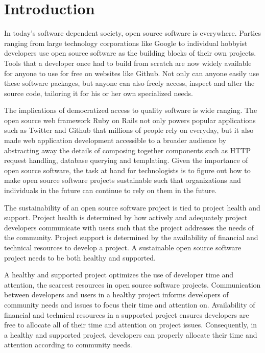 \section{Introduction}

In today's software dependent society, open source software is everywhere.
Parties ranging from large technology corporations like Google to individual
hobbyist developers use open source software as the building blocks of their own
projects. Tools that a developer once had to build from scratch are now widely
available for anyone to use for free on websites like Github. Not only can
anyone easily use these software packages, but anyone can also freely access,
inspect and alter the source code, tailoring it for his or her own specialized needs.

The implications of democratized access to quality software is wide ranging. The
open source web framework Ruby on Rails not only powers popular applications
such as Twitter and Github that millions of people rely on everyday, but it also
made web application development accessible to a broader audience by abstracting
away the details of composing together components such as HTTP request handling,
database querying and templating. Given the importance of open source software,
the task at hand for technologists is to figure out how to make open source
software projects sustainable such that organizations and individuals in the
future can continue to rely on them in the future.

The sustainability of an open source software project is tied to project health
and support. Project health is determined by how actively and adequately project
developers communicate with users such that the project
addresses the needs of the community. Project support is determined by the
availability of financial and technical resources to develop a project\cite{successOSS}. A sustainable
open source software project needs to be both healthy and supported.

A healthy and supported project optimizes the use of developer time and
attention, the scarcest resources in open source software projects.
Communication between developers and users in a healthy project informs
developers of community needs and issues to focus their time and
attention on. Availability of financial and technical resources in a supported
project ensures developers are free to allocate all of their time and attention on
project issues. Consequently, in a healthy and supported project, developers can
properly allocate their time and attention according to community needs.

